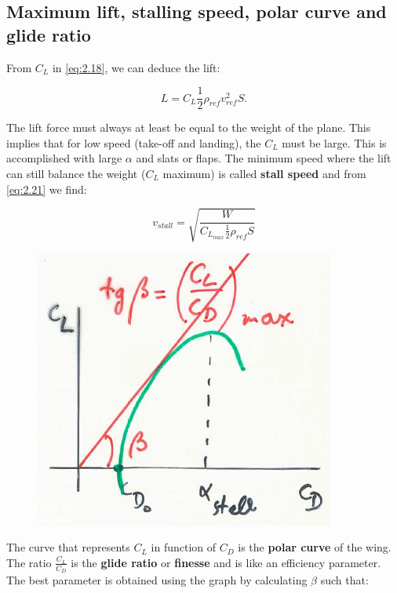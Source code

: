 		\subsection{Maximum lift, stalling speed, polar curve and glide ratio}
			From $C_L$ in \eqref{eq:2.18}, we can deduce the lift:
			
			\begin{equation}
			L = C_L \frac{1}{2} \rho _{ref} v^2_{ref} S.
			\label{eq:2.21}
			\end{equation}
			
			The lift force must always at least be equal to the weight of the plane. This implies that for low speed (take-off and landing), the $C_L$ must be large. This is accomplished with large $\alpha$ and slats or flaps. The minimum speed where the lift can still balance the weight ($C_L$ maximum) is called \textbf{stall speed} and from \eqref{eq:2.21} we find:
			
			\begin{equation}
			v_{stall} = \sqrt{\frac{W}{C_{L_{max}} \frac{1}{2} \rho_{ref} S}}
			\end{equation}
			
			\begin{figure}
			\vspace{-5mm}
			\includegraphics[scale=0.4]{ch2/21}
			\end{figure}
			The curve that represents $C_L$ in function of $C_D$ is the \textbf{polar curve} of the wing. The ratio $\frac{C_L}{C_D}$ is the \textbf{glide ratio} or \textbf{finesse} and is like an efficiency parameter. The best parameter is obtained using the graph by calculating $\beta$ such that: 
			
